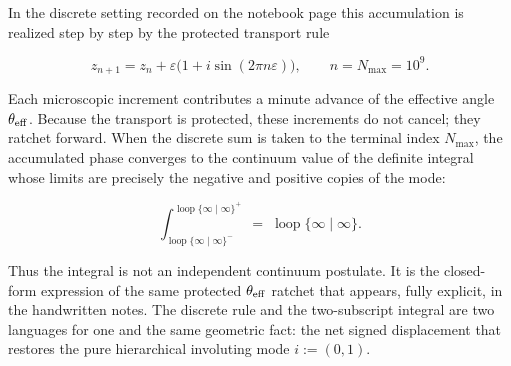 In the discrete setting recorded on the notebook page this accumulation is realized step by step by the protected transport rule

\[
z_{n+1}=z_n+\varepsilon\bigl(1+i\sin(2\pi n\varepsilon)\bigr),
\qquad
n=N_{\max}=10^9.
\]

Each microscopic increment contributes a minute advance of the effective angle \(\theta_{\rm eff}\). Because the transport is protected, these increments do not cancel; they ratchet forward. When the discrete sum is taken to the terminal index \(N_{\max}\), the accumulated phase converges to the continuum value of the definite integral whose limits are precisely the negative and positive copies of the mode:

\[
\int_{\operatorname{loop}\{\infty\mid\infty\}^{-}}^{\operatorname{loop}\{\infty\mid\infty\}^{+}}
\;=\;
\operatorname{loop}\{\infty\mid\infty\}.
\]

Thus the integral is not an independent continuum postulate. It is the closed-form expression of the same protected \(\theta_{\rm eff}\) ratchet that appears, fully explicit, in the handwritten notes. The discrete rule and the two-subscript integral are two languages for one and the same geometric fact: the net signed displacement that restores the pure hierarchical involuting mode \(i:=(0,1)\).
